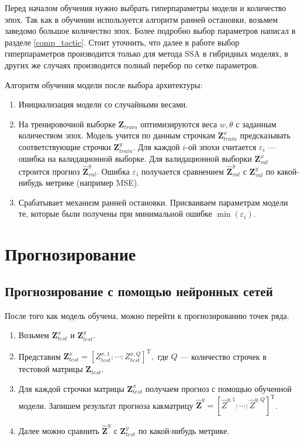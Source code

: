 \documentclass[specialist,
               substylefile = spbu.rtx,
               subf,href,colorlinks=true, 12p]{disser}
\begin{document}
Перед началом обучения нужно выбрать гиперпараметры модели и количество эпох. Так как в обучении используется алгоритм ранней остановки, возьмем заведомо большое количество эпох. Более подробно выбор параметров написал в разделе \ref{comp_tactic}. Стоит уточнить, что далее в работе выбор гиперпараметров производится только для метода SSA в гибридных моделях, в других же случаях производится полный перебор по сетке параметров.

Алгоритм обучения модели после выбора архитектуры:

\begin{enumerate}
	\item Инициализация модели со случайными весами.
	\item На тренировочной выборке $\mathbf{Z}_{train}$ оптимизируются веса $w, \theta$ с заданным количеством эпох. Модель учится по данным строчкам $\mathbf{Z}^x_{train}$ предсказывать соответствующие строчки $\mathbf{Z}^y_{train}$. Для каждой $i$-ой эпохи считается $\varepsilon_i$ --- ошибка на валидационной выборке. Для валидационной выборки $\mathbf{Z}^x_{val}$ строится прогноз $\widehat{\mathbf{Z}}^y_{val}$. Ошибка $\varepsilon_i$ получается сравнением $\widehat{\mathbf{Z}}^y_{val}$ с $\mathbf{Z}^y_{val}$ по какой-нибудь метрике (например MSE).
	\item Срабатывает механизм ранней остановки. Присваиваем параметрам модели те, которые были получены при минимальной ошибке $\min(\varepsilon_i)$.
\end{enumerate}

\section{Прогнозирование}


\subsection{Прогнозирование с помощью нейронных сетей}

После того как модель обучена, можно перейти к прогнозированию точек ряда.

\begin{enumerate}
	\item Возьмем  $\mathbf{Z}^x_{test}$ и $\mathbf{Z}^y_{test}$.
	\item Представим $\mathbf{Z}^x_{test} = [Z_{test}^{x, 1} : \cdots : Z_{test}^{x, Q}]^\mathrm{T}, $ где $Q$ --- количество строчек в тестовой матрицы $ \mathbf{Z}_{test} $.
	\item Для каждой строчки матрицы $\mathbf{Z}^x_{test}$ получаем прогноз с помощью обученной модели. Запишем результат прогноза как\linebreak матрицу $ \mathbf{\widehat{Z}}^y = [\widehat{Z}^{y, 1} : \cdots : \widehat{Z}^{y, Q}]^\mathrm{T}$.
	\item Далее можно сравнить $\mathbf{\widehat{Z}}^y $ с $\mathbf{Z}^y_{test}$ по какой-нибудь метрике.
\end{enumerate}
\end{document}
